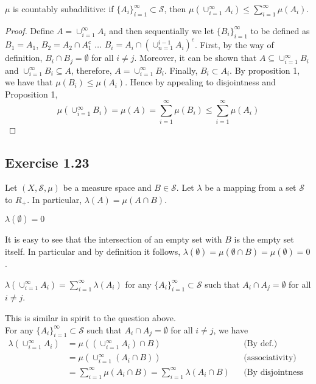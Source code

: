 \documentclass[12pt]{article}
\begin{document}
\begin{prop}
	$\mu$ is countably subadditive: if $\{A_i\}_{i=1}^{\infty} \subset \mathcal{S}$, then $\mu(\cup_{i=1}^{\infty} A_i) \leq \sum_{i=1}^{\infty} \mu(A_i)$.
\end{prop}
\begin{proof}
	Define $A = \cup_{i=1}^{\infty} A_i$ and then sequentially we let $\{B_i\}_{i=1}^{\infty}$ to be defined as  $B_1 = A_1$, $B_2 = A_2 \cap A_1^c$ $\ldots$ $B_i = A_i \cap (\cup_{n=1}^{i-1} A_i)^c$. First, by the way of definition, $B_i \cap B_j = \emptyset$ for all $i \ne j$. Moreover, it can be shown that $A\subseteq \cup_{i=1}^{\infty} B_i$ and $ \cup_{i=1}^{\infty} B_i \subseteq A$, therefore, $A=\cup_{i=1}^{\infty} B_i$. Finally, $B_i \subset A_i$. By proposition 1, we have that $\mu(B_i) \leq \mu(A_i)$. Hence by appealing to disjointness and Proposition 1,
	\begin{equation}
	\mu(\cup_{i=1}^{\infty} B_i)=\mu(A) = \sum_{i=1}^{\infty} \mu(B_i) \leq \sum_{i=1}^{\infty} \mu(A_i)
	\end{equation}

\end{proof}

\subsection{Exercise 1.23}

Let $(X,\mathcal{S}, \mu)$ be a measure space and $B \in \mathcal{S}$. Let $\lambda$ be a mapping from a set $\mathcal{S}$ to $R_{+}$. In particular, $\lambda(A) = \mu(A \cap B)$.
\begin{prop}
	$\lambda(\emptyset) = 0$
\end{prop}
It is easy to see that the intersection of an empty set with $B$ is the empty set itself. In particular and by definition it follows, $\lambda(\emptyset) = \mu(\emptyset \cap B) = \mu (\emptyset) = 0$.

\begin{prop}
	$\lambda(\cup_{i=1}^{\infty} A_i) = \sum_{i = 1}^{\infty} \lambda(A_i)$ for any $\{A_i\}_{i=1}^{\infty} \subset \mathcal{S}$ such that $A_i \cap A_j = \emptyset$ for all $i \ne j$.
\end{prop}

This is similar in spirit to the question above.\\
For any  $\{A_i\}_{i=1}^{\infty} \subset \mathcal{S}$ such that $A_i \cap A_j = \emptyset$ for all $i \ne j$, we have
\begin{align}
\lambda(\cup_{i=1}^{\infty} A_i) &= \mu((\cup_{i=1}^{\infty} A_i) \cap B)&& \text{(By def.)} \\ 
&= \mu(\cup_{i=1}^{\infty} (A_i \cap B)) && \text{(associativity)} \\
&= \sum_{i=1}^{\infty} \mu(A_i \cap B) = \sum_{i=1}^{\infty} \lambda(A_i \cap B) && \text{(By disjointness and additivity)} 
\end{align}
\end{document}
